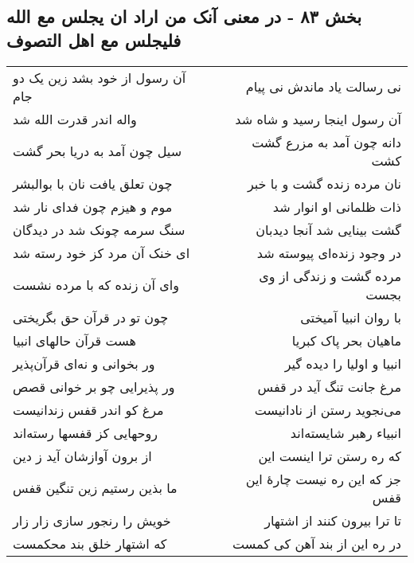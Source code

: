 \begin{center}
\section*{بخش ۸۳ - در معنی آنک من اراد ان یجلس مع الله فلیجلس مع اهل التصوف}
\label{sec:sh083}
\begin{longtable}{l p{0.5cm} r}
آن رسول از خود بشد زین یک دو جام
&&
نی رسالت یاد ماندش نی پیام
\\
واله اندر قدرت الله شد
&&
آن رسول اینجا رسید و شاه شد
\\
سیل چون آمد به دریا بحر گشت
&&
دانه چون آمد به مزرع گشت کشت
\\
چون تعلق یافت نان با بوالبشر
&&
نان مرده زنده گشت و با خبر
\\
موم و هیزم چون فدای نار شد
&&
ذات ظلمانی او انوار شد
\\
سنگ سرمه چونک شد در دیدگان
&&
گشت بینایی شد آنجا دیدبان
\\
ای خنک آن مرد کز خود رسته شد
&&
در وجود زنده‌ای پیوسته شد
\\
وای آن زنده که با مرده نشست
&&
مرده گشت و زندگی از وی بجست
\\
چون تو در قرآن حق بگریختی
&&
با روان انبیا آمیختی
\\
هست قرآن حالهای انبیا
&&
ماهیان بحر پاک کبریا
\\
ور بخوانی و نه‌ای قرآن‌پذیر
&&
انبیا و اولیا را دیده گیر
\\
ور پذیرایی چو بر خوانی قصص
&&
مرغ جانت تنگ آید در قفس
\\
مرغ کو اندر قفس زندانیست
&&
می‌نجوید رستن از نادانیست
\\
روحهایی کز قفسها رسته‌اند
&&
انبیاء رهبر شایسته‌اند
\\
از برون آوازشان آید ز دین
&&
که ره رستن ترا اینست این
\\
ما بذین رستیم زین تنگین قفس
&&
جز که این ره نیست چارهٔ این قفس
\\
خویش را رنجور سازی زار زار
&&
تا ترا بیرون کنند از اشتهار
\\
که اشتهار خلق بند محکمست
&&
در ره این از بند آهن کی کمست
\\
\end{longtable}
\end{center}
